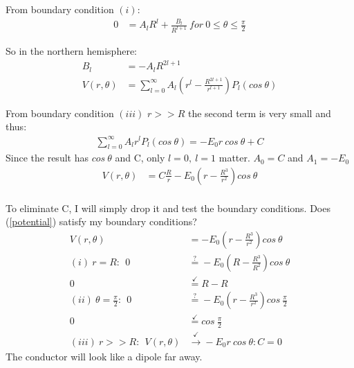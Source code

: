 \documentclass[a4paper,12pt]{article}
\begin{document}
From boundary condition $(i)$:
\begin{align}
0&=A_lR^l+\frac{B_l}{R^{l+1}}\  for\  0\le\theta\le\frac{\pi}{2}
\end{align}

 So in the northern hemisphere:
\begin{align}
B_l&=-A_lR^{2l+1}\\
V(r,\theta)&=\sum\limits_{l=0}^\infty
A_l(r^l-\frac{R^{2l+1}}{r^{l+1}})P_l(cos\ \theta)
\end{align}

From boundary condition $(iii)$ $r>>R$ the second term is very small
and thus:
\begin{align}
\sum\limits_{l=0}^\infty A_lr^lP_l(cos\ \theta)= -E_0r\ cos\ \theta+C
\end{align}Since the result has $cos\ \theta$ and C, only $l=0,\ l=1$
matter. $A_0=C$ and $A_1=-E_0$
\begin{align}
V(r,\theta)&=C\frac{R}{r}-E_0(r-\frac{R^3}{r^2})cos\ \theta
\end{align}\\
To eliminate C, I will simply drop it and test the boundary
conditions.  Does (\ref{potential}) satisfy my boundary conditions?
\\
\begin{align}
V(r,\theta)&=-E_0(r-\frac{R^3}{r^2})cos\ \theta\label{potential}\\
(i)\ r=R:\ \ 0&\overset{?}{=}-E_0(R-\frac{R^3}{R^2})cos\ \theta\\
0&\overset{\checkmark}{=}R-R\\
(ii)\ \theta=\frac{\pi}{2}:\ \ 0&\overset{?}{=}-E_0(r-\frac{R^3}{r^2})cos\ \frac{\pi}{2}\\
0&\overset{\checkmark}{=}cos\ \frac{\pi}{2}\\
(iii)\ r>>R:\ \ V(r,\theta)&\overset{\checkmark}{\rightarrow}-E_0r\ cos\ \theta: C=0
\end{align}
The conductor will look like a dipole far away.
\end{document}
